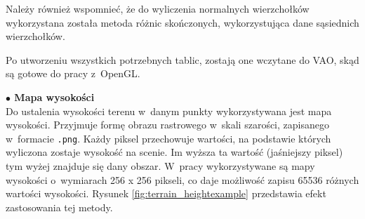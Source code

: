 \documentclass[a4paper,twoside,12pt]{book}
\begin{document}
%

Należy również wspomnieć, że do wyliczenia normalnych wierzchołków wykorzystana została metoda różnic skończonych, wykorzystująca dane sąsiednich wierzchołków.



Po utworzeniu wszystkich potrzebnych tablic, zostają one wczytane do VAO, skąd są gotowe do pracy z~OpenGL.

\vspace{\baselineskip}
\textbf{$\bullet$ Mapa wysokości} \\
Do ustalenia wysokości terenu w~danym punkty wykorzystywana jest mapa wysokości. Przyjmuje formę obrazu rastrowego w~skali szarości, zapisanego w~formacie \texttt{.png}. Każdy piksel przechowuje wartości, na podstawie których wyliczona zostaje wysokość na scenie. Im wyższa ta wartość (jaśniejszy piksel) tym wyżej znajduje się dany obszar. W~pracy wykorzystywane są mapy wysokości o~wymiarach 256 x 256 pikseli, co daje możliwość zapisu 65536 różnych wartości wysokości. Rysunek \ref{fig:terrain_heightexample} przedstawia efekt zastosowania tej metody.
\end{document}
